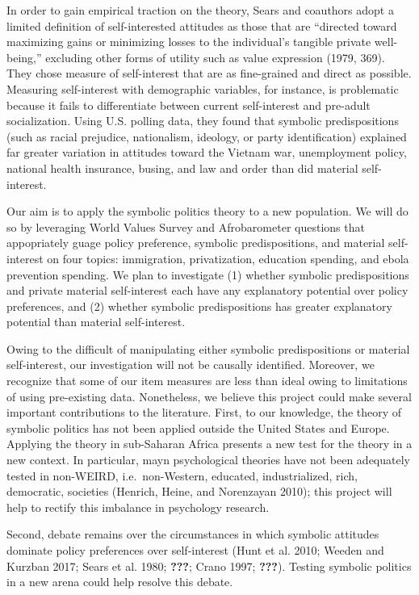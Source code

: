 \documentclass[]{article}
\begin{document}
In order to gain empirical traction on the theory, Sears and coauthors
adopt a limited definition of self-interested attitudes as those that
are ``directed toward maximizing gains or minimizing losses to the
individual's tangible private well-being,'' excluding other forms of
utility such as value expression (1979, 369). They chose measure of
self-interest that are as fine-grained and direct as possible. Measuring
self-interest with demographic variables, for instance, is problematic
because it fails to differentiate between current self-interest and
pre-adult socialization. Using U.S. polling data, they found that
symbolic predispositions (such as racial prejudice, nationalism,
ideology, or party identification) explained far greater variation in
attitudes toward the Vietnam war, unemployment policy, national health
insurance, busing, and law and order than did material self-interest.

Our aim is to apply the symbolic politics theory to a new population. We
will do so by leveraging World Values Survey and Afrobarometer questions
that appopriately guage policy preference, symbolic predispositions, and
material self-interest on four topics: immigration, privatization,
education spending, and ebola prevention spending. We plan to
investigate (1) whether symbolic predispositions and private material
self-interest each have any explanatory potential over policy
preferences, and (2) whether symbolic predispositions has greater
explanatory potential than material self-interest.

Owing to the difficult of manipulating either symbolic predispositions
or material self-interest, our investigation will not be causally
identified. Moreover, we recognize that some of our item measures are
less than ideal owing to limitations of using pre-existing data.
Nonetheless, we believe this project could make several important
contributions to the literature. First, to our knowledge, the theory of
symbolic politics has not been applied outside the United States and
Europe. Applying the theory in sub-Saharan Africa presents a new test
for the theory in a new context. In particular, mayn psychological
theories have not been adequately tested in non-WEIRD, i.e.~non-Western,
educated, industrialized, rich, democratic, societies (Henrich, Heine,
and Norenzayan 2010); this project will help to rectify this imbalance
in psychology research.

Second, debate remains over the circumstances in which symbolic
attitudes dominate policy preferences over self-interest (Hunt et al.
2010; Weeden and Kurzban 2017; Sears et al. 1980; {\textbf{???}}; Crano
1997; {\textbf{???}}). Testing symbolic politics in a new arena could
help resolve this debate.
\end{document}

